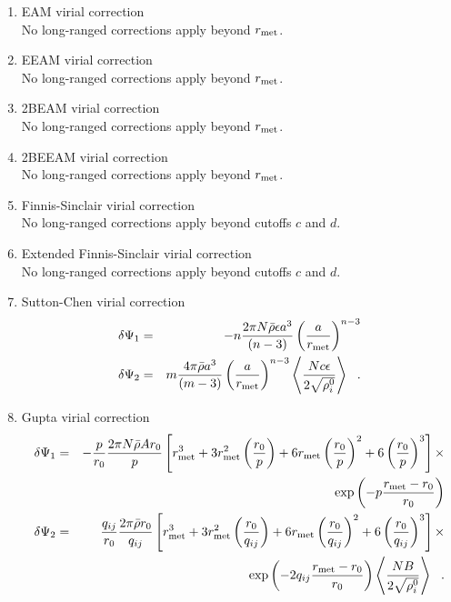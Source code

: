 \begin{enumerate}
\item EAM virial correction \\
No long-ranged corrections apply beyond $r_{\rm met}$.
\item EEAM virial correction \\
No long-ranged corrections apply beyond $r_{\rm met}$.
\item 2BEAM virial correction \\
No long-ranged corrections apply beyond $r_{\rm met}$.
\item 2BEEAM virial correction \\
No long-ranged corrections apply beyond $r_{\rm met}$.
\item Finnis-Sinclair virial correction \\
No long-ranged corrections apply beyond cutoffs $c$ and $d$.
\item Extended Finnis-Sinclair virial correction \\
No long-ranged corrections apply beyond cutoffs $c$ and $d$.
\item Sutton-Chen virial correction
\begin{eqnarray}
\delta \Psi_{1} &=& -n \frac{2 \pi N \bar{\rho} \epsilon a^{3}}{(n-3)}
\left( \frac{a}{r_{\rm met}} \right)^{n-3} \nonumber \\
\delta \Psi_{2} &=& m \frac{4 \pi \bar{\rho} a^{3}}{(m-3)} \left( \frac{a}{r_{\rm met}} \right)^{n-3}
\left< \frac{N c \epsilon}{2\sqrt{\rho_{i}^{0}}} \right>~~.
\end{eqnarray}
\item Gupta virial correction
\begin{eqnarray}
\delta \Psi_{1} &=& -\frac{p}{r_{0}} \frac{2 \pi N \bar{\rho} A r_{0}}{p}
\left[ r_{\rm met}^{3} + 3 r_{\rm met}^{2} \left(\frac{r_{0}}{p}\right) +
6 r_{\rm met} \left(\frac{r_{0}}{p}\right)^{2} + 6 \left(\frac{r_{0}}{p}\right)^{3} \right] \times \nonumber \\
& & \exp \left( -p \frac{r_{\rm met}-r_{0}}{r_{0}}\right) \nonumber \\
\delta \Psi_{2} &=& \frac{q_{ij}}{r_{0}} \frac{2 \pi \bar{\rho} r_{0}}{q_{ij}}
\left[ r_{\rm met}^{3} + 3 r_{\rm met}^{2} \left(\frac{r_{0}}{q_{ij}}\right) +
6 r_{\rm met} \left(\frac{r_{0}}{q_{ij}}\right)^{2} + 6 \left(\frac{r_{0}}{q_{ij}}\right)^{3} \right] \times \\
& & \exp \left( -2 q_{ij} \frac{r_{\rm met}-r_{0}}{r_{0}}\right)
\left< \frac{N B}{2\sqrt{\rho_{i}^{0}}} \right>~~. \nonumber
\end{eqnarray}
\end{enumerate}


